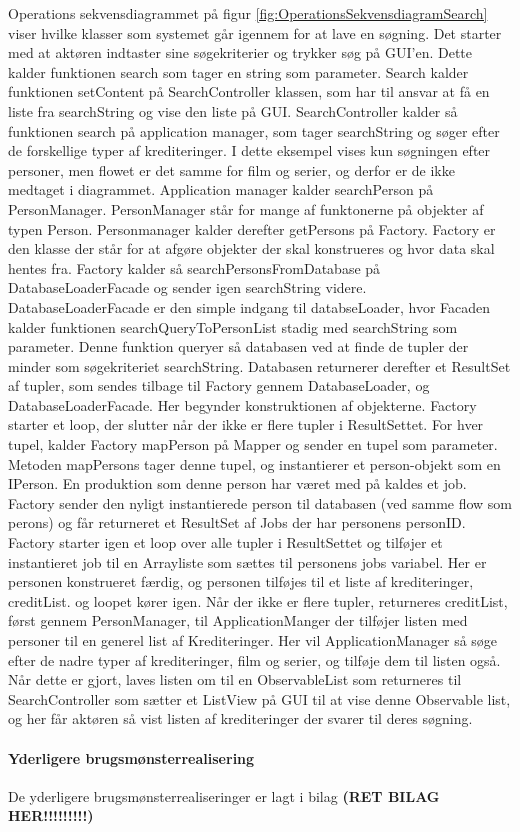 Operations sekvensdiagrammet på figur \ref{fig:OperationsSekvensdiagramSearch} viser hvilke klasser som systemet går igennem for at lave en søgning. Det starter med at aktøren indtaster sine søgekriterier og trykker søg på GUI'en. Dette kalder funktionen search som tager en string som parameter. Search kalder funktionen setContent på SearchController klassen, som har til ansvar at få en liste fra searchString og vise den liste på GUI. SearchController kalder så funktionen search på application manager, som tager searchString og søger efter de forskellige typer af krediteringer. I dette eksempel vises kun søgningen efter personer, men flowet er det samme for film og serier, og derfor er de ikke medtaget i diagrammet. Application manager kalder searchPerson på PersonManager. PersonManager står for mange af funktonerne på objekter af typen Person. Personmanager kalder derefter getPersons på Factory. Factory er den klasse der står for at afgøre objekter der skal konstrueres og hvor data skal hentes fra. Factory kalder så searchPersonsFromDatabase på DatabaseLoaderFacade og sender igen searchString videre. DatabaseLoaderFacade er den simple indgang til databseLoader, hvor Facaden kalder funktionen searchQueryToPersonList stadig med searchString som parameter. Denne funktion queryer så databasen ved at finde de tupler der minder som søgekriteriet searchString. Databasen returnerer derefter et ResultSet af tupler, som sendes tilbage til Factory gennem DatabaseLoader, og DatabaseLoaderFacade. Her begynder konstruktionen af objekterne. Factory starter et loop, der slutter når der ikke er flere tupler i ResultSettet. For hver tupel, kalder Factory mapPerson på Mapper og sender en tupel som parameter. Metoden mapPersons tager denne tupel, og instantierer et person-objekt som en IPerson. En produktion som denne person har været med på kaldes et job. Factory sender den nyligt instantierede person til databasen (ved samme flow som perons) og får returneret et ResultSet af Jobs der har personens personID. Factory starter igen et loop over alle tupler i ResultSettet og tilføjer et instantieret job til en Arrayliste som sættes til personens jobs variabel. Her er personen konstrueret færdig, og personen tilføjes til et liste af krediteringer, creditList. og loopet kører igen. Når der ikke er flere tupler, returneres creditList, først gennem PersonManager, til ApplicationManger der tilføjer listen med personer til en generel list af Krediteringer. Her vil ApplicationManager så søge efter de nadre typer af krediteringer, film og serier, og tilføje dem til listen også. Når dette er gjort, laves listen om til en ObservableList som returneres til SearchController som sætter et ListView på GUI til at vise denne Observable list, og her får aktøren så vist listen af krediteringer der svarer til deres søgning.

\paragraph{Yderligere brugsmønsterrealisering} De yderligere brugsmønsterrealiseringer er lagt i bilag \textbf{(RET BILAG HER!!!!!!!!!)}


